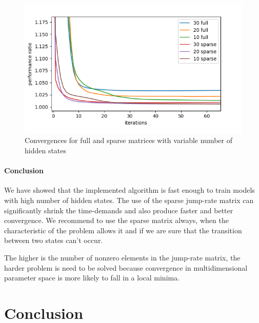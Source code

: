 \documentclass[thesis=M,english]{FITthesis}[2012/10/20]
\begin{document}
\begin{figure}
\centering
\includegraphics[width=1\linewidth]{img/ex5.3/big.png}
\caption{Convergences for full and sparse matrices with variable number of hidden states}
\label{fig:big}
\end{figure}

\subsubsection*{ Conclusion }

We have showed that the implemented algorithm is fast enough to train models with high number of hidden states. The use of the sparse jump-rate matrix can significantly shrink the time-demands and also produce faster and better convergence. We recommend to use the sparse matrix always, when the characteristic of the problem allows it and if we are sure that the transition between two states can't occur. 

The higher is the number of nonzero elements in the jump-rate matrix, the harder problem is need to be solved because convergence in multidimensional parameter space is more likely to fall in a local minima.  




\chapter{Conclusion}
\end{document}
